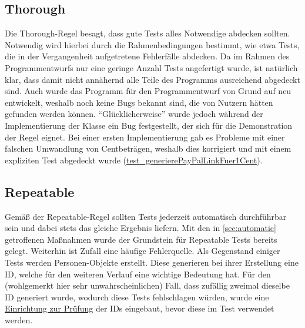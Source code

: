 \subsection{Thorough}
Die Thorough-Regel besagt, dass gute Tests alles Notwendige abdecken sollten.
Notwendig wird hierbei durch die Rahmenbedingungen bestimmt, wie etwa Tests, die in der Vergangenheit aufgetretene Fehlerfälle abdecken.
Da im Rahmen des Programmentwurfs nur eine geringe Anzahl Tests angefertigt wurde, ist natürlich klar, dass damit nicht annähernd alle Teile des Programms ausreichend abgedeckt sind.
Auch wurde das Programm für den Programmentwurf von Grund auf neu entwickelt, weshalb noch keine Bugs bekannt sind, die von Nutzern hätten gefunden werden können.
\enquote{Glücklicherweise} wurde jedoch während der Implementierung der Klasse  ein Bug festgestellt, der sich für die Demonstration der Regel eignet.
Bei einer ersten Implementierung gab es Probleme mit einer falschen Umwandlung von Centbeträgen, weshalb dies korrigiert und mit einem expliziten Test abgedeckt wurde (\href{https://github.com/yschiebelhut/carpool-java/blob/6d938e78763ca42270aafb8f51de4104c88e558a/0-carpool-java-integration/src/test/java/paypal/PayPalLinkBuilderTest.java#L27}{test\_generierePayPalLinkFuer1Cent}).

\subsection{Repeatable}
Gemäß der Repeatable-Regel sollten Tests jederzeit automatisch durchführbar sein und dabei stets das gleiche Ergebnis liefern.
Mit den in \autoref{sec:automatic} getroffenen Maßnahmen wurde der Grundstein für Repeatable Tests bereits gelegt.
Weiterhin ist Zufall eine häufige Fehlerquelle.
Als Gegenstand einiger Tests werden Personen-Objekte erstellt.
Diese generieren bei ihrer Erstellung eine ID, welche für den weiteren Verlauf eine wichtige Bedeutung hat.
Für den (wohlgemerkt hier sehr unwahrscheinlichen) Fall, dass zufällig zweimal dieselbe ID generiert wurde, wodurch diese Tests fehlschlagen würden, wurde eine \href{https://github.com/yschiebelhut/carpool-java/blob/6d938e78763ca42270aafb8f51de4104c88e558a/0-carpool-java-plugin-json/src/test/java/speicher/JsonPersonRepositoryTest.java#L132}{Einrichtung zur Prüfung} der IDs eingebaut, bevor diese im Test verwendet werden.

